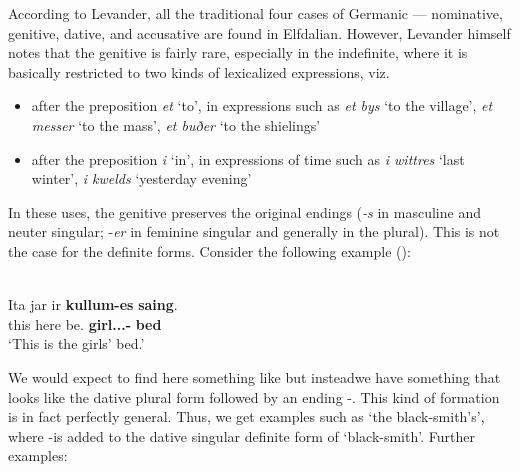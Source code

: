 According to Levander, all the traditional four cases of Germanic — nominative, genitive, dative, and accusative are found in Elfdalian. However, Levander himself notes that the genitive is fairly rare, especially in the indefinite, where it is basically restricted to two kinds of lexicalized expressions, viz. 

\begin{itemize}
\item after the preposition \textit{et} ‘to’, in expressions such as \textit{et bys} ‘to the village’, \textit{et messer} ‘to the mass’, \textit{et buðer} ‘to the shielings’
\item after the preposition \textit{i} ‘in’, in expressions of time such as \textit{i wittres} ‘last winter’, \textit{i kwelds }‘yesterday evening’
\end{itemize}



In these uses, the genitive preserves the original endings (\textit{\nobreakdash-s }in masculine and neuter singular; \nobreakdash-\textit{er} in feminine singular and generally in the plural). This is not the case for the definite forms. Consider the following example (\citealt[96]{Levander1909}):


\ea%
\\
\gll Ita  jar  ir  \textbf{kullum-es} \textbf{saing}.\\
this  here  be.{\prs}  \textbf{girl.{}.{\pl}.{\dat}-{\poss}} \textbf{bed}\\
\glt ‘This is the girls’ bed.’
\z

We would expect to find here something like but instead\textstyleLinguisticExample{ }we have something that looks like the dative plural form  followed by an ending \nobreakdash-. This kind of formation is in fact perfectly general. Thus, we get examples such as  ‘the black-smith’s’, where \nobreakdash-is added to the dative singular definite form  of  ‘black-smith’. Further examples:

